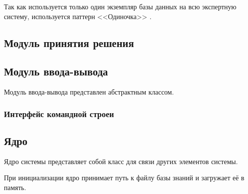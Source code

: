 Так как используется только один экземпляр базы данных на всю экспертную систему, используется паттерн <<Одиночка>> \cite{gammaDesignPatternsElements1995}.

\subsection{Модуль принятия решения}

\subsection{Модуль ввода-вывода}

Модуль ввода-вывода представлен абстрактным классом.

\subsubsection{Интерфейс командной строеи}

\subsection{Ядро}

Ядро системы представляет собой класс для связи других элементов системы.

При инициализации ядро принимает путь к файлу базы знаний и загружает её в память.

